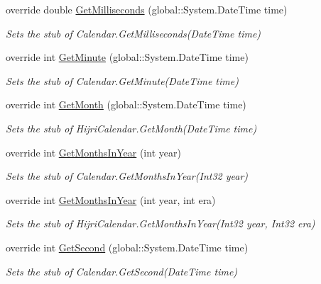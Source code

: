 \begin{DoxyCompactItemize}
override double \hyperlink{class_system_1_1_globalization_1_1_fakes_1_1_stub_hijri_calendar_aa0c15e7720f1249625e9d24ba17fd7a0}{Get\-Milliseconds} (global\-::\-System.\-Date\-Time time)
\begin{DoxyCompactList}\small\item\em Sets the stub of Calendar.\-Get\-Milliseconds(\-Date\-Time time)\end{DoxyCompactList}\item 
override int \hyperlink{class_system_1_1_globalization_1_1_fakes_1_1_stub_hijri_calendar_a615facc23dd65eaa93213951016fc076}{Get\-Minute} (global\-::\-System.\-Date\-Time time)
\begin{DoxyCompactList}\small\item\em Sets the stub of Calendar.\-Get\-Minute(\-Date\-Time time)\end{DoxyCompactList}\item 
override int \hyperlink{class_system_1_1_globalization_1_1_fakes_1_1_stub_hijri_calendar_a734ffc1a6d054b3587e0a5e0b3905367}{Get\-Month} (global\-::\-System.\-Date\-Time time)
\begin{DoxyCompactList}\small\item\em Sets the stub of Hijri\-Calendar.\-Get\-Month(\-Date\-Time time)\end{DoxyCompactList}\item 
override int \hyperlink{class_system_1_1_globalization_1_1_fakes_1_1_stub_hijri_calendar_a29f0ef0eeebf0bcc9fe74e3a738c2feb}{Get\-Months\-In\-Year} (int year)
\begin{DoxyCompactList}\small\item\em Sets the stub of Calendar.\-Get\-Months\-In\-Year(\-Int32 year)\end{DoxyCompactList}\item 
override int \hyperlink{class_system_1_1_globalization_1_1_fakes_1_1_stub_hijri_calendar_a7d5b47c2237b23a759ec8ef537523250}{Get\-Months\-In\-Year} (int year, int era)
\begin{DoxyCompactList}\small\item\em Sets the stub of Hijri\-Calendar.\-Get\-Months\-In\-Year(\-Int32 year, Int32 era)\end{DoxyCompactList}\item 
override int \hyperlink{class_system_1_1_globalization_1_1_fakes_1_1_stub_hijri_calendar_ab315013a2304d05998ed8955a1dfee53}{Get\-Second} (global\-::\-System.\-Date\-Time time)
\begin{DoxyCompactList}\small\item\em Sets the stub of Calendar.\-Get\-Second(\-Date\-Time time)\end{DoxyCompactList}\item 

\end{DoxyCompactItemize}
